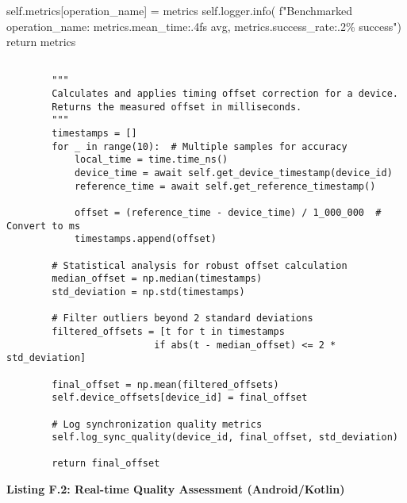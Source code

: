 \documentclass[12pt,a4paper]{report}
\begin{document}
        self.metrics[operation\_name] = metrics
        self.logger.info(
            f"Benchmarked {operation\_name}: {metrics.mean\_time:.4f}s avg, {metrics.success\_rate:.2\%} success")
        return metrics
\begin{verbatim}

        """
        Calculates and applies timing offset correction for a device.
        Returns the measured offset in milliseconds.
        """
        timestamps = []
        for _ in range(10):  # Multiple samples for accuracy
            local_time = time.time_ns()
            device_time = await self.get_device_timestamp(device_id)
            reference_time = await self.get_reference_timestamp()
            
            offset = (reference_time - device_time) / 1_000_000  # Convert to ms
            timestamps.append(offset)
            
        # Statistical analysis for robust offset calculation
        median_offset = np.median(timestamps)
        std_deviation = np.std(timestamps)
        
        # Filter outliers beyond 2 standard deviations
        filtered_offsets = [t for t in timestamps 
                          if abs(t - median_offset) <= 2 * std_deviation]
        
        final_offset = np.mean(filtered_offsets)
        self.device_offsets[device_id] = final_offset
        
        # Log synchronization quality metrics
        self.log_sync_quality(device_id, final_offset, std_deviation)
        
        return final_offset

\end{verbatim}

\textbf{Listing F.2: Real-time Quality Assessment (Android/Kotlin)}
\end{document}
